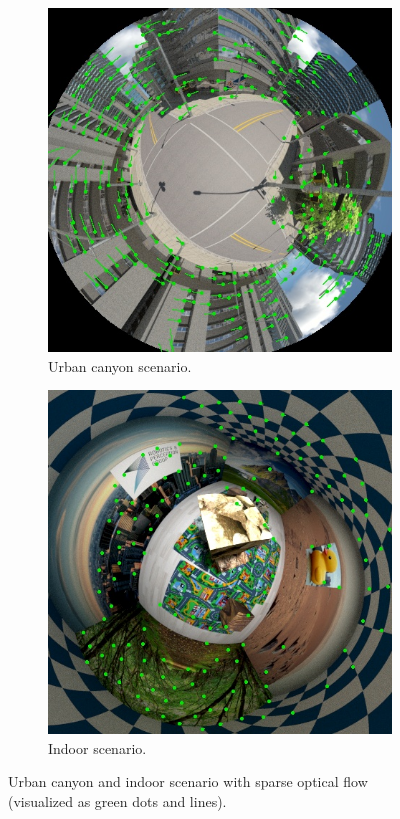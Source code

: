 \begin{figure}[]
  \centering
  \begin{subfigure}[]{0.475\textwidth}
    \includegraphics[width=\textwidth]{./figures/robot/method_systemstructure_features.jpg}
    \caption{Urban canyon scenario.}
    \label{fig:robot_experiments_simulation_urbancanyon}
  \end{subfigure}\hfill
  \begin{subfigure}[]{0.475\textwidth}
    \includegraphics[width=\textwidth]{./figures/robot/indoor_features.jpg}
    \caption{Indoor scenario.}
    \label{fig:robot_experiments_simulation_indoor}
  \end{subfigure}
  \caption{Urban canyon and indoor scenario with sparse optical flow (visualized as green dots and lines).}
  \label{fig:robot_experiments_simulation}
\end{figure}

